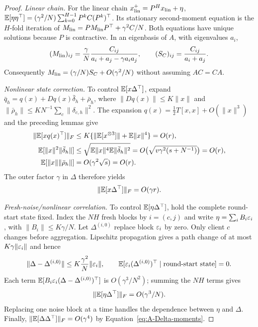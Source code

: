 \begin{proof}
\emph{Linear chain.}
For the linear chain $x_{\rm lin}^+=P^Hx_{\rm lin}+\eta$,
$\mathbb{E}[\eta\eta^\top]=(\gamma^2/N)\sum_{k=0}^{H-1}P^kC(P^k)^\top$.
Its stationary second-moment equation is the $H$-fold iteration of
$M_{\rm lin}=PM_{\rm lin}P^\top+\gamma^2C/N$.
Both equations have unique solutions because $P$ is contractive.
In an eigenbasis of $A$, with eigenvalues $a_i$,
\begin{equation}
\label{eq:A-Mlin-coord}
 (M_{\rm lin})_{ij}=\frac{\gamma}{N}
 \frac{C_{ij}}{a_i+a_j-\gamma a_ia_j},\qquad
 (S_C)_{ij}=\frac{C_{ij}}{a_i+a_j}.
\end{equation}
Consequently $M_{\rm lin}=(\gamma/N)S_C+O(\gamma^2/N)$ without
assuming $AC=CA$.

\emph{Nonlinear state correction.}
To control $\mathbb{E}[x\Delta^\top]$, expand
$\bar q_h=q(x)+Dq(x)\bar\delta_h+\bar\rho_h$,
where $\|Dq(x)\|\le K\|x\|$ and
$\|\bar\rho_h\|\le K N^{-1}\sum_c\|\delta_{c,h}\|^2$.
The expansion $q(x)=\frac12T[x,x]+O(\|x\|^3)$ and the preceding lemmas give
\begin{align*}
 \|\mathbb{E}[xq(x)^\top]\|_F&\le K\{\|\mathbb{E}[x^{\otimes3}]\|+\mathbb{E}\|x\|^4\}=O(r),\\
 \mathbb{E}[\|x\|^2\|\bar\delta_h\|]&\le
 \sqrt{\mathbb{E}\|x\|^4\mathbb{E}\|\bar\delta_h\|^2}
 =O\bigl(\sqrt{v\gamma^2(s+N^{-1})}\bigr)=O(r),\\
 \mathbb{E}[\|x\|\|\bar\rho_h\|]&=O(\gamma^2\sqrt{s})=O(r).
\end{align*}
The outer factor $\gamma$ in $\Delta$ therefore yields
\begin{equation}
\label{eq:A-xDelta}
 \|\mathbb{E}[x\Delta^\top]\|_F=O(\gamma r).
\end{equation}

\emph{Fresh-noise/nonlinear correlation.}
To control $\mathbb{E}[\eta\Delta^\top]$, hold the complete round-start state fixed.
Index the $NH$ fresh blocks by $i=(c,j)$ and write
$\eta=\sum_iB_i\varepsilon_i$, with $\|B_i\|\le K\gamma/N$.
Let $\Delta^{(i,0)}$ replace block $\varepsilon_i$ by zero.
Only client $c$ changes before aggregation. Lipschitz propagation gives a
path change of at most $K\gamma\|\varepsilon_i\|$ and hence
\[
 \|\Delta-\Delta^{(i,0)}\|\le K\frac{\gamma^2}{N}\|\varepsilon_i\|,\qquad
 \mathbb{E}[\varepsilon_i(\Delta^{(i,0)})^\top\mid\text{round-start state}]=0.
\]
Each term $\mathbb{E}[B_i\varepsilon_i(\Delta-\Delta^{(i,0)})^\top]$ is
$O(\gamma^3/N^2)$; summing the $NH$ terms gives
\begin{equation}
\label{eq:A-etaDelta}
 \|\mathbb{E}[\eta\Delta^\top]\|_F=O(\gamma^3/N).
\end{equation}
Replacing one noise block at a time handles the dependence between
$\eta$ and $\Delta$. Finally,
$\|\mathbb{E}[\Delta\Delta^\top]\|_F=O(\gamma^4)$ by
Equation~\eqref{eq:A-Delta-moments}.


\end{proof}
